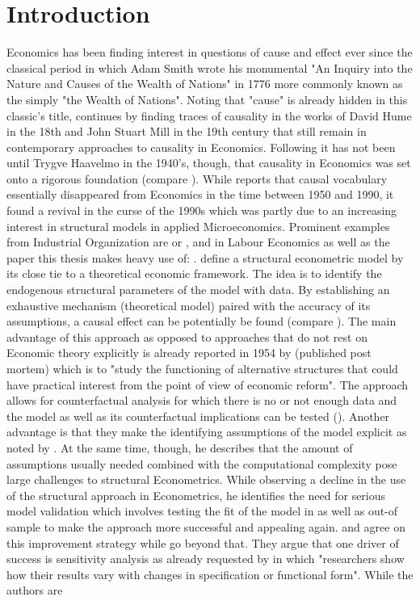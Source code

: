 \section{Introduction}
\thispagestyle{plain} %

Economics has been finding interest in questions of cause and effect ever since the classical period in which Adam Smith wrote his monumental "An Inquiry into the Nature and Causes of the Wealth of Nations" in 1776 more commonly known as the simply "the Wealth of Nations". Noting that "cause" is already hidden in this classic's title, \cite{Hoover.2008} continues by finding traces of causality in the works of David Hume in the 18th and John Stuart Mill in the 19th century that still remain in contemporary approaches to causality in Economics. Following \cite{Heckman.2013} it has not been until Trygve Haavelmo in the 1940's, though, that causality in Economics was set onto a rigorous foundation (compare \cite{Haavelmo.1943, Haavelmo.1944}). While \cite{Hoover.2008} reports that causal vocabulary essentially disappeared from Economics in the time between 1950 and 1990, it found a revival in the curse of the 1990s which was partly due to an increasing interest in structural models in applied Microeconomics. Prominent examples from Industrial Organization are \cite{Berry.1995} or \cite{Goldberg.1995}, \cite{Keane.1994} and \cite{Keane.1997} in Labour Economics as well as the paper this thesis makes heavy use of: \cite{Rust.1987}. \cite{Low.2017} define a structural econometric model by its close tie to a theoretical economic framework. The idea is to identify the endogenous structural parameters of the model with data. By establishing an exhaustive mechanism (theoretical model) paired with the accuracy of its assumptions, a causal effect can be potentially be found (compare \cite{Morgan.2015}). The main advantage of this approach as opposed to approaches that do not rest on Economic theory explicitly is already reported in 1954 by \cite{Haavelmo.2015} (published post mortem) which is to "study the functioning of alternative structures that could have practical interest from the point of view of economic reform". The approach allows for counterfactual analysis for which there is no or not enough data and the model as well as its counterfactual implications can be tested (\cite{Low.2017}). Another advantage is that they make the identifying assumptions of the model explicit as noted by \cite{Keane.2010}. At the same time, though, he describes that the amount of assumptions usually needed combined with the computational complexity pose large challenges to structural Econometrics. While observing a decline in the use of the structural approach in Econometrics, he identifies the need for serious model validation which involves testing the fit of the model in as well as out-of sample to make the approach more successful and appealing again. \cite{Rust.2014} and \cite{Wolpin.2013} agree on this improvement strategy while \cite{Angrist.2010} go beyond that. They argue that one driver of success is sensitivity analysis as already requested by \cite{Leamer.1983} in which "researchers show how their results vary with changes in specification or functional form". While the authors are 
